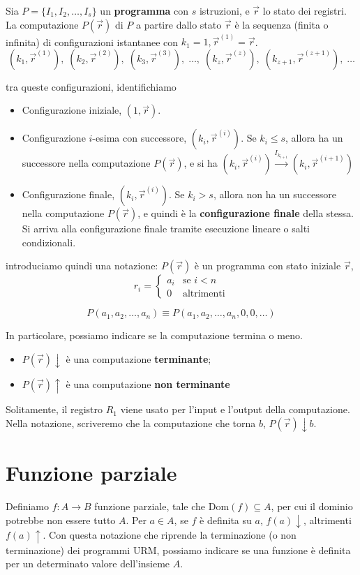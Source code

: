 	Sia $P = \{I_1, I_2, \dots, I_s\}$ un \textbf{programma} con $s$ istruzioni, e $\vec{r}$ lo stato dei registri. La computazione $P(\vec{r})$ di $P$ a partire dallo stato $\vec{r}$ è la sequenza (finita o infinita) di configurazioni istantanee con $k_1 = 1, \vec{r}^{(1)}=\vec{r}$.
	$$
	(k_1, \vec{r}^{(1)}),\;
	(k_2, \vec{r}^{(2)}),\;
	(k_3, \vec{r}^{(3)}),\;
	\ldots,\;
	(k_z, \vec{r}^{(z)}),\;
	(k_{z+1}, \vec{r}^{(z+1)}),\;
	\ldots
	$$
	
	tra queste configurazioni, identifichiamo
	
	\begin{itemize}
		\item Configurazione iniziale, $(1, \vec{r})$.
		\item Configurazione $i$-esima con successore, $(k_i, \vec{r}^{(i)})$. Se $k_i \leq s$, allora ha un successore nella computazione $P(\vec{r})$, e si ha $(k_i, \vec{r}^{(i)}) \xrightarrow{I_{k_{i+1}}} (k_i, \vec{r}^{(i+1)})$
		\item Configurazione finale, $(k_i, \vec{r}^{(i)})$. Se $k_i > s$, allora non ha un successore nella computazione $P(\vec{r})$, e quindi è la \textbf{configurazione finale} della stessa. Si arriva alla configurazione finale tramite esecuzione lineare o salti condizionali.
	\end{itemize}
	
	introduciamo quindi una notazione: $P(\vec{r})$ è un programma con stato iniziale $\vec{r}$,
	$$
	r_i =
	\begin{cases}
		a_i & \text{se } i <n \\
		0 & \text{altrimenti}
	\end{cases}
	$$
	
	$$
	P(a_1, a_2, \ldots, a_n)
	\equiv
	P(a_1, a_2, \ldots, a_n, 0, 0, \ldots)
	$$
	
	In particolare, possiamo indicare se la computazione termina o meno.
	\begin{itemize}
		\item $P(\vec{r})\downarrow$ è una computazione \textbf{terminante};
		\item $P(\vec{r})\uparrow$ è una computazione \textbf{non terminante}
	\end{itemize}
	
	Solitamente, il registro $R_1$ viene usato per l'input e l'output della computazione. Nella notazione, scriveremo che la computazione che torna $b$, $P(\vec{r})\downarrow b$. 
	
	
	\section{Funzione parziale}
	Definiamo $f: A \to B$ funzione parziale, tale che $\text{Dom}(f) \subseteq A$, per cui il dominio potrebbe non essere tutto $A$. Per $a \in A$, se $f$ è definita su $a$, $f(a)\downarrow$, altrimenti $f(a)\uparrow$. Con questa notazione che riprende la terminazione (o non terminazione) dei programmi URM, possiamo indicare se una funzione è definita per un determinato valore dell'insieme $A$.
	
